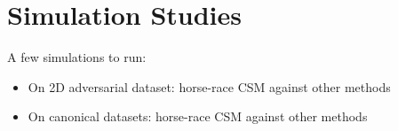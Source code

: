 \documentclass{article}
\newcommand{\note}[1]{\textcolor{red}{\textit{#1}}}
\begin{document}





\section{Simulation Studies}
\label{sec:simulation}

A few simulations to run:
\begin{itemize}
    \item On 2D adversarial dataset: horse-race CSM against other methods
    \item On canonical datasets: horse-race CSM against other methods
\end{itemize}
\end{document}
